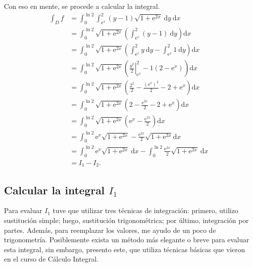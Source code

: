 \documentclass{fmbvecto}
\begin{document}
\begin{problema}
    Con eso en mente, se procede a calcular la integral.
    \begin{align*}
        \int_D f &= \int_{0}^{\ln 2} \int_{\mathrm{e}^x}^{2} (y-1) \sqrt{1 + \mathrm{e}^{2x}} \: \mathrm{d}y \: \mathrm{d}x \\
        &= \int_{0}^{\ln 2} \sqrt{1 + \mathrm{e}^{2x}} \left( \int_{\mathrm{e}^x}^{2} (y-1) \: \mathrm{d}y \right) \mathrm{d}x \\
        &= \int_{0}^{\ln 2} \sqrt{1 + \mathrm{e}^{2x}} \left( \int_{\mathrm{e}^x}^{2} y \: \mathrm{d}y - \int_{\mathrm{e}^x}^{2} 1 \: \mathrm{d}y \right) \mathrm{d}x \\
        &= \int_{0}^{\ln 2} \sqrt{1 + \mathrm{e}^{2x}} \left( \left. \frac{y^2}{2} \right\vert_{\mathrm{e}^x}^{2} -  1(2 - \mathrm{e}^x) \right) \mathrm{d}x \\
        &= \int_{0}^{\ln 2} \sqrt{1 + \mathrm{e}^{2x}} \left( \frac{2^2}{2} - \frac{(\mathrm{e}^x)^2}{2} - 2 + \mathrm{e}^x \right) \mathrm{d}x \\
        &= \int_{0}^{\ln 2} \sqrt{1 + \mathrm{e}^{2x}} \left( 2 - \frac{\mathrm{e}^{2x}}{2} - 2 + \mathrm{e}^x \right) \mathrm{d}x \\
        &= \int_{0}^{\ln 2} \sqrt{1 + \mathrm{e}^{2x}} \left( \mathrm{e}^x - \frac{\mathrm{e}^{2x}}{2}\right) \mathrm{d}x \\
        &= \int_{0}^{\ln 2} \mathrm{e}^x \sqrt{1 + \mathrm{e}^{2x}} - \frac{\mathrm{e}^{2x}}{2} \sqrt{1 + \mathrm{e}^{2x}} \mathrm{d}x \\
        &= \int_{0}^{\ln 2} \mathrm{e}^x \sqrt{1 + \mathrm{e}^{2x}} \: \mathrm{d}x  - \int_{0}^{\ln 2} \frac{\mathrm{e}^{2x}}{2} \sqrt{1 + \mathrm{e}^{2x}} \: \mathrm{d}x \\
        &= I_1  - I_2.
    \end{align*}

    \subsection{Calcular la integral \(I_1\)}

    Para evaluar \(I_1\) tuve que utilizar tres técnicas de integración: primero, utilizo sustitución simple; luego, sustitución trigonométrica; por último, integración por partes. Además, para reemplazar los valores, me ayudo de un poco de trigonometría. Posiblemente exista un método más elegante o breve para evaluar esta integral, sin embargo, presento este, que utiliza técnicas básicas que vieron en el curso de Cálculo Integral. \\
    

\end{problema}
\end{document}
